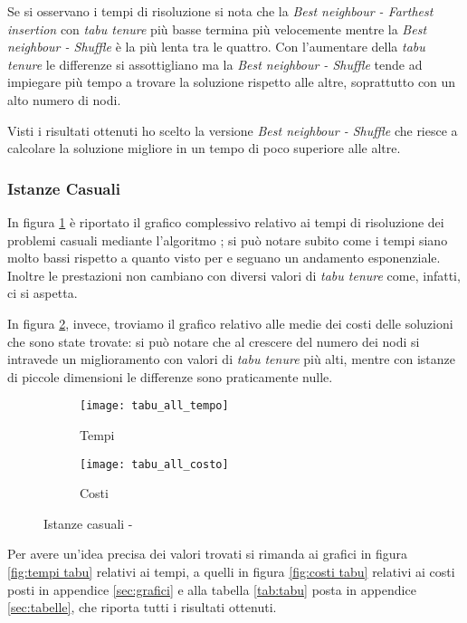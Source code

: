 Se si osservano i tempi di risoluzione si nota che la \emph{Best neighbour - Farthest insertion} con \emph{tabu tenure} più basse termina più velocemente mentre la \emph{Best neighbour - Shuffle} è la più lenta tra le quattro.
Con l'aumentare della \emph{tabu tenure} le differenze si assottigliano ma la \emph{Best neighbour - Shuffle} tende ad impiegare più tempo a trovare la soluzione rispetto alle altre, soprattutto con un alto numero di nodi.

Visti i risultati ottenuti ho scelto la versione \emph{Best neighbour - Shuffle} che riesce a calcolare la soluzione migliore in un tempo di poco superiore alle altre.


\subsubsection{Istanze Casuali}
In figura \ref{fig:all tempi tabu} è riportato il grafico complessivo relativo ai tempi di risoluzione dei problemi casuali mediante l'algoritmo \tabu; si può notare subito come i tempi siano molto bassi rispetto a quanto visto per  e seguano un andamento esponenziale.
Inoltre le prestazioni non cambiano con diversi valori di \emph{tabu tenure} come, infatti, ci si aspetta.

In figura \ref{fig:all costi tabu}, invece, troviamo il grafico relativo alle medie dei costi delle soluzioni che sono state trovate: si può notare che al crescere del numero dei nodi si intravede un miglioramento con valori di \emph{tabu tenure} più alti, mentre con istanze di piccole dimensioni le differenze sono praticamente nulle.

\begin{figure}[H]
	\centering
	\begin{subfigure}[b]{.45\textwidth}
			\texttt{[image: tabu\_all\_tempo]}
			\caption{Tempi}
			\label{fig:all tempi tabu}
	\end{subfigure}
	\quad
	\begin{subfigure}[b]{.45\textwidth}
			\texttt{[image: tabu\_all\_costo]}
			\caption{Costi}
			\label{fig:all costi tabu}
	\end{subfigure}
	\caption{Istanze casuali - \tabu}
	\label{fig:all tempi costi tabu}
\end{figure}

Per avere un'idea precisa dei valori trovati si rimanda ai grafici in figura \ref{fig:tempi tabu} relativi ai tempi, a quelli in figura \ref{fig:costi tabu} relativi ai costi posti in appendice \ref{sec:grafici} e alla tabella \ref{tab:tabu} posta in appendice \ref{sec:tabelle}, che riporta tutti i risultati ottenuti.

